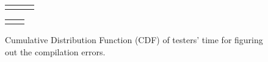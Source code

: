 \begin{figure}
\centering
{
  \setlength{\tabcolsep}{0pt}
\begin{tabular}{ccc}
  \subfigure[\bh{TM}]{
  \scalebox{\cmfigscale}{
    \begin{tikzpicture}
  
\end{tikzpicture}}
} &
\subfigure[\bh{CQ}]{
  \scalebox{\cmfigscale}{
  \begin{tikzpicture}
  
\end{tikzpicture}}
} &
\subfigure[\bh{CP}]{
  \scalebox{\cmfigscale}{
  \begin{tikzpicture}
  
\end{tikzpicture}}
} \\
\end{tabular}}
\begin{tabular}{cc}
\subfigure[\bh{ST}]{
  \scalebox{\cmfigscale}{
  \begin{tikzpicture}
  
\end{tikzpicture}}
} &
\subfigure[\bh{OM}]{
  \scalebox{\cmfigscale}{
  \begin{tikzpicture}
  
\end{tikzpicture}}
} \\
\end{tabular}

\caption{Cumulative Distribution Function (CDF) of testers' time for figuring out the compilation errors.}
\label{fig:ces}
\end{figure}
